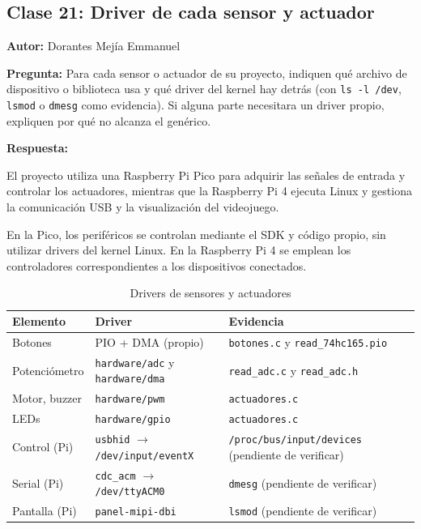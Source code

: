 \subsection{Clase 21: Driver de cada sensor y actuador}
\textbf{Autor:} Dorantes Mejía Emmanuel

\textbf{Pregunta:} Para cada sensor o actuador de su proyecto,
indiquen qué archivo de dispositivo o biblioteca usa y qué
driver del kernel hay detrás (con \texttt{ls -l /dev},
\texttt{lsmod} o \texttt{dmesg} como evidencia).
Si alguna parte necesitara un driver propio, expliquen
por qué no alcanza el genérico.

\medskip
\textbf{Respuesta:}

El proyecto utiliza una Raspberry Pi Pico para adquirir las
señales de entrada y controlar los actuadores, mientras que
la Raspberry Pi 4 ejecuta Linux y gestiona la comunicación
USB y la visualización del videojuego.

En la Pico, los periféricos se controlan mediante el SDK
y código propio, sin utilizar drivers del kernel Linux.
En la Raspberry Pi 4 se emplean los controladores
correspondientes a los dispositivos conectados.

\begin{table}[H]
    \centering
    \caption{Drivers de sensores y actuadores}
    \label{tab:drivers}
    \small
    \begin{tabular}{|p{1.8cm}|p{2.6cm}|p{2.6cm}|}
        \hline
        \textbf{Elemento} & \textbf{Driver} &
        \textbf{Evidencia} \\
        \hline
        Botones &
        PIO + DMA (propio) &
        \texttt{botones.c} y
        \texttt{read\_74hc165.pio} \\
        \hline
        Potenciómetro &
        \texttt{hardware/adc} y
        \texttt{hardware/dma} &
        \texttt{read\_adc.c} y
        \texttt{read\_adc.h} \\
        \hline
        Motor, buzzer &
        \texttt{hardware/pwm} &
        \texttt{actuadores.c} \\
        \hline
        LEDs &
        \texttt{hardware/gpio} &
        \texttt{actuadores.c} \\
        \hline
        Control (Pi) &
        \texttt{usbhid}
        $\rightarrow$
        \texttt{/dev/input/eventX} &
        \texttt{/proc/bus/input/devices}
        (pendiente de verificar) \\
        \hline
        Serial (Pi) &
        \texttt{cdc\_acm}
        $\rightarrow$
        \texttt{/dev/ttyACM0} &
        \texttt{dmesg}
        (pendiente de verificar) \\
        \hline
        Pantalla (Pi) &
        \texttt{panel-mipi-dbi} &
        \texttt{lsmod}
        (pendiente de verificar) \\
        \hline
    \end{tabular}
\end{table}

